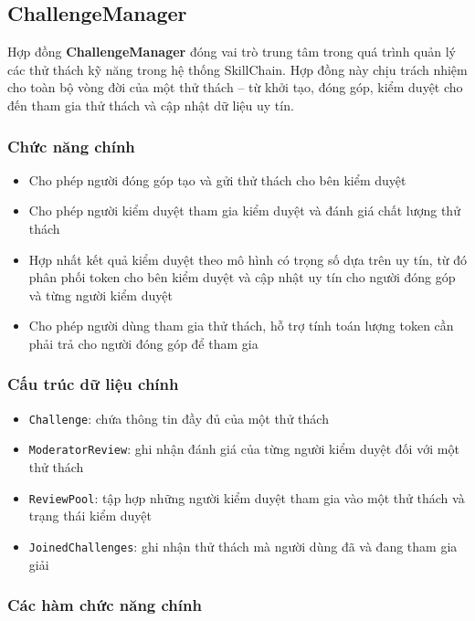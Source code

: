 
\subsection{ChallengeManager}

Hợp đồng \textbf{ChallengeManager} đóng vai trò trung tâm trong quá trình quản lý các thử thách kỹ năng trong hệ thống SkillChain.
Hợp đồng này chịu trách nhiệm cho toàn bộ vòng đời của một thử thách -- từ khởi tạo, đóng góp, kiểm duyệt cho đến tham gia thử thách và cập nhật dữ liệu uy tín.

\subsubsection{Chức năng chính}

\begin{itemize}
  \item Cho phép người đóng góp tạo và gửi thử thách cho bên kiểm duyệt
  \item Cho phép người kiểm duyệt tham gia kiểm duyệt và đánh giá chất lượng thử thách
  \item Hợp nhất kết quả kiểm duyệt theo mô hình có trọng số dựa trên uy tín, từ đó phân phối token cho bên kiểm duyệt và cập nhật uy tín cho người đóng góp và từng người kiểm duyệt
  \item Cho phép người dùng tham gia thử thách, hỗ trợ tính toán lượng token cần phải trả cho người đóng góp để tham gia
\end{itemize}

\subsubsection{Cấu trúc dữ liệu chính}

\begin{itemize}
  \item \texttt{Challenge}: chứa thông tin đầy đủ của một thử thách
  \item \texttt{ModeratorReview}: ghi nhận đánh giá của từng người kiểm duyệt đối với một thử thách
  \item \texttt{ReviewPool}: tập hợp những người kiểm duyệt tham gia vào một thử thách và trạng thái kiểm duyệt
  \item \texttt{JoinedChallenges}: ghi nhận thử thách mà người dùng đã và đang tham gia giải
\end{itemize}

\subsubsection{Các hàm chức năng chính}


